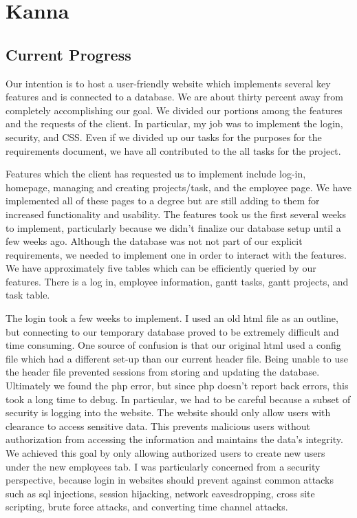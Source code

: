 \documentclass[letterpaper,10pt,titlepage,journal,compsoc,draftclsnofoot,onecolumn]{IEEEtran}
\newcommand\tab[1][1cm]{\hspace*{#1}}
\begin{document}
\section{Kanna}

\subsection{Current Progress}

\tab Our intention is to host a user-friendly website which implements several key features and is connected to a database. We are about thirty percent away from completely accomplishing our goal. We divided our portions among the features and the requests of the client. In particular, my job was to implement the login, security, and CSS. Even if we divided up our tasks for the purposes for the requirements document, we have all contributed to the all tasks for the project.\newline 

\tab Features which the client has requested us to implement include log-in, homepage, managing and creating projects/task, and the employee page. We have implemented all of these pages to a degree but are still adding to them for increased functionality and usability. The features took us the first several weeks to implement, particularly because we didn’t finalize our database setup until a few weeks ago. Although the database was not not part of our explicit requirements, we needed to implement one in order to interact with the features. We have approximately five tables which can be efficiently queried by our features. There is a log in, employee information, gantt tasks, gantt projects, and task table.\newline 

\tab The login took a few weeks to implement. I used an old html file as an outline, but connecting to our temporary database proved to be extremely difficult and time consuming. One source of confusion is that our original html used a config file which had a different set-up than our current header file. Being unable to use the header file prevented sessions from storing and updating the database. Ultimately we found the php error, but since php doesn’t report back errors, this took a long time to debug. In particular, we had to be careful because a subset of security is logging into the website. The website should only allow users with clearance to access sensitive data. This prevents malicious users without authorization from accessing the information and maintains the data’s integrity. We achieved this goal by only allowing authorized users to create new users under the new employees tab. I was particularly concerned from a security perspective, because login in websites should prevent against common attacks such as sql injections, session hijacking, network eavesdropping, cross site scripting, brute force attacks, and converting time channel attacks.\newline 
\end{document}
